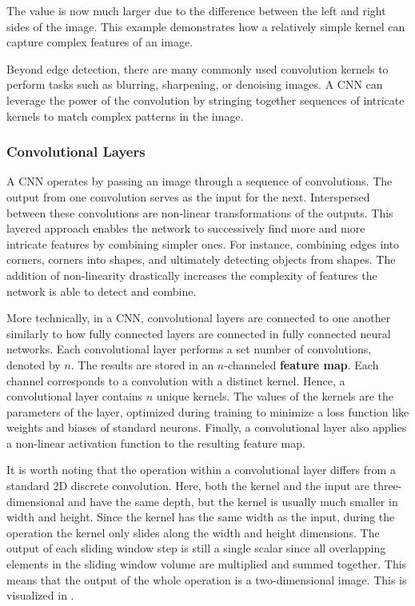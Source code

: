 The value is now much larger due to the difference between the left and right sides of the image. This example demonstrates how a relatively simple kernel can capture complex features of an image.

Beyond edge detection, there are many commonly used convolution kernels to perform tasks such as blurring, sharpening, or denoising images. A CNN can leverage the power of the convolution by stringing together sequences of intricate kernels to match complex patterns in the image.

\subsubsection{Convolutional Layers}

A CNN operates by passing an image through a sequence of convolutions. The output from one convolution serves as the input for the next. Interspersed between these convolutions are non-linear transformations of the outputs. This layered approach enables the network to successively find more and more intricate features by combining simpler ones. For instance, combining edges into corners, corners into shapes, and ultimately detecting objects from shapes. The addition of non-linearity drastically increases the complexity of features the network is able to detect and combine.

More technically, in a CNN, convolutional layers are connected to one another similarly to how fully connected layers are connected in fully connected neural networks. Each convolutional layer performs a set number of convolutions, denoted by $n$. The results are stored in an $n$-channeled \textbf{feature map}. Each channel corresponds to a convolution with a distinct kernel. Hence, a convolutional layer contains $n$ unique kernels. The values of the kernels are the parameters of the layer, optimized during training to minimize a loss function like weights and biases of standard neurons. Finally, a convolutional layer also applies a non-linear activation function to the resulting feature map.

It is worth noting that the operation within a convolutional layer differs from a standard 2D discrete convolution. Here, both the kernel and the input are three-dimensional and have the same depth, but the kernel is usually much smaller in width and height. Since the kernel has the same width as the input, during the operation the kernel only slides along the width and height dimensions. The output of each sliding window step is still a single scalar since all overlapping elements in the sliding window volume are multiplied and summed together. This means that the output of the whole operation is a two-dimensional image. This is visualized in .

